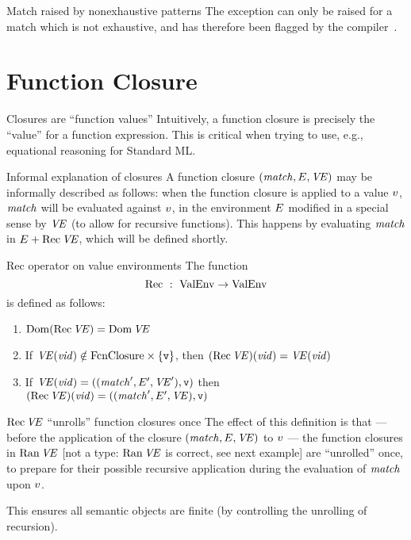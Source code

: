 \begin{clause}{Match raised by nonexhaustive patterns}
The exception  can only be raised for a match which is not
exhaustive, and has therefore been flagged by the compiler~.
\end{clause}

\section{Function Closure}

\begin{remark}{Closures are ``function values''}
Intuitively, a function closure is precisely the ``value'' for a
function expression. This is critical when trying to use, e.g.,
equational reasoning for Standard ML.
\end{remark}

\begin{clause}{Informal explanation of closures}
A function closure $(\textit{match\/},E,\textit{V\kern-.05emE\/})$ may be informally described as follows:
when the function closure is applied to a value $v$, $\textit{match\/}$ will be
evaluated against $v$, in the environment $E$ modified in a special
sense by $\textit{V\kern-.05emE\/}$ (to allow for recursive functions). This happens by
evaluating $\textit{match\/}$ in $E + \mathop{\rm Rec}\nolimits\textit{V\kern-.05emE\/}$, which will be defined shortly.
\end{clause}

\begin{definition}{Rec operator on value environments}
The function
\begin{equation*}
\mathop{\rm Rec}\nolimits\ :\ {\rm ValEnv}\to{\rm ValEnv}
\end{equation*}
is defined as follows:
\begin{enumerate}
\item $\mathop{\rm Dom}\nolimits(\mathop{\rm Rec}\nolimits\textit{V\kern-.05emE\/})=\mathop{\rm Dom}\nolimits\textit{V\kern-.05emE\/} $
\item If $\textit{V\kern-.05emE\/}(\textit{vid\/})\notin{\rm FcnClosure}\times\{\hbox{\tt v}\}$,
      then $(\mathop{\rm Rec}\nolimits\textit{V\kern-.05emE\/})(\textit{vid\/})=\textit{V\kern-.05emE\/}(\textit{vid\/})$
\item If $\textit{V\kern-.05emE\/}(\textit{vid\/})=((\textit{match\/}',E',\textit{V\kern-.05emE\/}'), \hbox{\tt v})$
      then $(\mathop{\rm Rec}\nolimits\textit{V\kern-.05emE\/})(\textit{vid\/})=((\textit{match\/}',E',\textit{V\kern-.05emE\/}), \hbox{\tt v})$
\end{enumerate}
\end{definition}

\begin{remark}{$\mathop{\rm Rec}\nolimits\textit{V\kern-.05emE\/}$ ``unrolls'' function closures once}
The effect of this definition is that --- before the application of the
closure $(\textit{match\/},E,\textit{V\kern-.05emE\/})$ to $v$ --- the function closures in $\mathop{\rm Ran}\nolimits\textit{V\kern-.05emE\/}$
[not a type: $\mathop{\rm Ran}\nolimits\textit{V\kern-.05emE\/}$ is correct, see next example]
are ``unrolled'' once, to prepare for their possible recursive
application during the evaluation of $\textit{match\/}$ upon $v$.

This ensures all semantic objects are finite (by controlling the
unrolling of recursion).
\end{remark}

